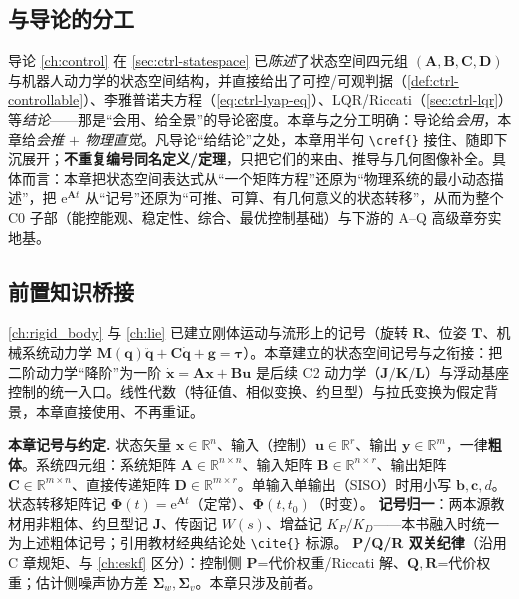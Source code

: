 \subsection*{与导论的分工}
导论 \cref{ch:control} 在 \cref{sec:ctrl-statespace} 已\emph{陈述}了状态空间四元组 $(\mathbf{A},\mathbf{B},\mathbf{C},\mathbf{D})$ 与机器人动力学的状态空间结构，并直接给出了可控/可观判据（\cref{def:ctrl-controllable}）、李雅普诺夫方程（\cref{eq:ctrl-lyap-eq}）、LQR/Riccati（\cref{sec:ctrl-lqr}）等\emph{结论}——那是“会用、给全景”的导论密度。本章与之分工明确：导论给\emph{会用}，本章给\emph{会推 $+$ 物理直觉}。凡导论“给结论”之处，本章用半句 \verb|\cref{}| 接住、随即下沉展开；\textbf{不重复编号同名定义/定理}，只把它们的来由、推导与几何图像补全。具体而言：本章把状态空间表达式从“一个矩阵方程”还原为“物理系统的最小动态描述”，把 $\mathrm{e}^{\mathbf{A}t}$ 从“记号”还原为“可推、可算、有几何意义的状态转移”，从而为整个 C0 子部（能控能观、稳定性、综合、最优控制基础）与下游的 A--Q 高级章夯实地基。

\subsection*{前置知识桥接}
\cref{ch:rigid_body} 与 \cref{ch:lie} 已建立刚体运动与流形上的记号（旋转 $\mathbf{R}$、位姿 $\mathbf{T}$、机械系统动力学 $\mathbf{M}(\mathbf{q})\ddot{\mathbf{q}}+\mathbf{C}\dot{\mathbf{q}}+\mathbf{g}=\boldsymbol{\tau}$）。本章建立的状态空间记号与之衔接：把二阶动力学“降阶”为一阶 $\dot{\mathbf{x}}=\mathbf{A}\mathbf{x}+\mathbf{B}\mathbf{u}$ 是后续 C2 动力学（$\mathbf{J}/\mathbf{K}/\mathbf{L}$）与浮动基座控制的统一入口。线性代数（特征值、相似变换、约旦型）与拉氏变换为假定背景，本章直接使用、不再重证。

\begin{note}
\textbf{本章记号与约定.}\;
状态矢量 $\mathbf{x}\in\mathbb{R}^n$、输入（控制）$\mathbf{u}\in\mathbb{R}^r$、输出 $\mathbf{y}\in\mathbb{R}^m$，一律\textbf{粗体}。系统四元组：系统矩阵 $\mathbf{A}\in\mathbb{R}^{n\times n}$、输入矩阵 $\mathbf{B}\in\mathbb{R}^{n\times r}$、输出矩阵 $\mathbf{C}\in\mathbb{R}^{m\times n}$、直接传递矩阵 $\mathbf{D}\in\mathbb{R}^{m\times r}$。单输入单输出（SISO）时用小写 $\mathbf{b},\mathbf{c},d$。状态转移矩阵记 $\boldsymbol{\Phi}(t)=\mathrm{e}^{\mathbf{A}t}$（定常）、$\boldsymbol{\Phi}(t,t_0)$（时变）。
\textbf{记号归一}：两本源教材用非粗体、约旦型记 $\mathbf{J}$、传函记 $W(s)$、增益记 $K_P/K_D$——本书融入时统一为上述粗体记号；引用教材经典结论处 \verb|\cite{}| 标源。
\textbf{P/Q/R 双关纪律}（沿用 C 章规矩、与 \cref{ch:eskf} 区分）：控制侧 $\mathbf{P}$=代价权重/Riccati 解、$\mathbf{Q},\mathbf{R}$=代价权重；估计侧噪声协方差 $\boldsymbol{\Sigma}_w,\boldsymbol{\Sigma}_v$。本章只涉及前者。
\end{note}

